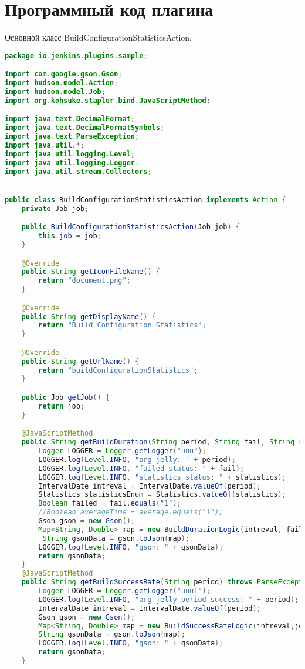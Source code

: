 \chapter{Программный код плагина}\label{appendix-extra-examples}

Основной класс BuildConfigurationStatisticsAction.

\begin{lstlisting}[language=Java]
package io.jenkins.plugins.sample;

import com.google.gson.Gson;
import hudson.model.Action;
import hudson.model.Job;
import org.kohsuke.stapler.bind.JavaScriptMethod;

import java.text.DecimalFormat;
import java.text.DecimalFormatSymbols;
import java.text.ParseException;
import java.util.*;
import java.util.logging.Level;
import java.util.logging.Logger;
import java.util.stream.Collectors;


public class BuildConfigurationStatisticsAction implements Action {
    private Job job;

    public BuildConfigurationStatisticsAction(Job job) {
        this.job = job;
    }

    @Override
    public String getIconFileName() {
        return "document.png";
    }

    @Override
    public String getDisplayName() {
        return "Build Configuration Statistics";
    }

    @Override
    public String getUrlName() {
        return "buildConfigurationStatistics";
    }

    public Job getJob() {
        return job;
    }

    @JavaScriptMethod
    public String getBuildDuration(String period, String fail, String statistics) throws ParseException {
        Logger LOGGER = Logger.getLogger("uuu");
        LOGGER.log(Level.INFO, "arg jelly: " + period);
        LOGGER.log(Level.INFO, "failed status: " + fail);
        LOGGER.log(Level.INFO, "statistics status: " + statistics);
        IntervalDate intreval = IntervalDate.valueOf(period);
        Statistics statisticsEnum = Statistics.valueOf(statistics);
        Boolean failed = fail.equals("1");
        //Boolean averageTime = average.equals("1");
        Gson gson = new Gson();
        Map<String, Double> map = new BuildDurationLogic(intreval, failed,job.getBuilds()).getBuildsDuration(statisticsEnum);
         String gsonData = gson.toJson(map);
        LOGGER.log(Level.INFO, "gson: " + gsonData);
        return gsonData;
    }
    @JavaScriptMethod
    public String getBuildSuccessRate(String period) throws ParseException {
        Logger LOGGER = Logger.getLogger("uuu1");
        LOGGER.log(Level.INFO, "arg jelly period success: " + period);
        IntervalDate intreval = IntervalDate.valueOf(period);
        Gson gson = new Gson();
        Map<String, Double> map = new BuildSuccessRateLogic(intreval,job.getBuilds()).getSuccessRate();
        String gsonData = gson.toJson(map);
        LOGGER.log(Level.INFO, "gson: " + gsonData);
        return gsonData;
    }


\end{lstlisting}
